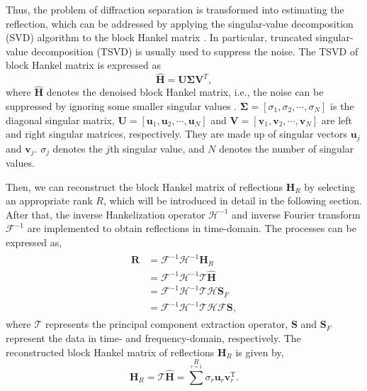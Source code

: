 Thus, the problem of diffraction separation is transformed into estimating the reflection, which can be addressed by applying the singular-value decomposition (SVD) algorithm to the block Hankel matrix \cite[]{Chen2016An}. In particular, truncated singular-value decomposition (TSVD) is usually used to suppress the noise. The TSVD of block Hankel matrix is expressed as
\begin{equation} \label{eq:svd}
\mathbf{\hat{H}}=\mathbf{U}\mathbf{\Sigma}\mathbf{V}^T,
\end{equation}
where $\mathbf{\hat{H}}$ denotes the denoised block Hankel matrix, i.e., the noise can be suppressed by ignoring some smaller singular values \cite[]{2020Diffraction}.  $\mathbf{\Sigma}=[{\sigma}_1,{\sigma}_2,\cdots,{\sigma}_N]$ is the diagonal singular matrix, $\mathbf{U}=[\mathbf{u}_1,\mathbf{u}_2,\cdots,\mathbf{u}_N]$ and $\mathbf{V}=[\mathbf{v}_1,\mathbf{v}_2,\cdots,\mathbf{v}_N]$ are left and right singular matrices, respectively. They are made up of singular vectors $\mathbf{u}_j$ and $\mathbf{v}_j$. $\sigma_j$ denotes the $j$th singular value, and $N$ denotes the number of singular values.

Then, we can reconstruct the block Hankel matrix of reflections $\mathbf{H}_R$ by selecting an appropriate rank $R$, which will be introduced in detail in the following section. After that, the inverse Hankelization operator $\mathcal{H}^{-1}$ and inverse Fourier transform $\mathcal{F}^{-1}$ are implemented to obtain reflections in time-domain. 
The processes can be expressed as,
\begin{align}\label{eq:rtime}
\begin{split}
\mathbf{R}&= \mathcal{F}^{-1} \mathcal{H}^{-1}\mathbf{H}_R\\ 
&= \mathcal{F}^{-1} \mathcal{H}^{-1}\mathcal{T}\mathbf{\hat{H}}\\ 
&= \mathcal{F}^{-1} \mathcal{H}^{-1}\mathcal{T}\mathcal{H}\mathbf{S}_F\\ 
&=\mathcal{F}^{-1} \mathcal{H}^{-1} \mathcal{T}\mathcal{H}\mathcal{F}\mathbf{S}, 
\end{split}
\end{align}
where $\mathcal{T}$ represents the principal component extraction operator, $\mathbf{S}$ and $\mathbf{S}_F$ represent the data in time- and frequency-domain, respectively. The reconstructed block Hankel matrix of reflections $\mathbf{H}_R$ is given by,
\begin{equation}\label{eq:HR}
\mathbf{H}_R=\mathcal{T}\mathbf{\hat{H}}=\sum^R \limits_{r=1} {\sigma}_r\mathbf{u}_r\mathbf{v}_r^\text{T}.
\end{equation}

